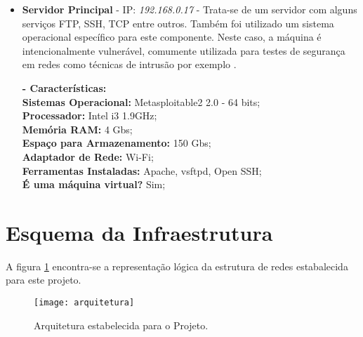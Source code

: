 \begin{itemize}
			\textbf{- Características:} \\
			\textbf{Sistemas Operacional:} Security Onion 12.04 - 64 bits; \\
			\textbf{Processador:} Intel i3 1.9GHz; \\
			\textbf{Memória RAM:} 4 Gbs; \\
			\textbf{Espaço para Armazenamento:} 150 Gbs; \\
			\textbf{Adaptador de Rede:} Wi-Fi; \\
			\textbf{Ferramentas Instaladas:} Snort e Snorby; \\
			\textbf{É uma máquina virtual?} Não; \\
	
			\item \textbf{Servidor Principal} - IP: \emph{192.168.0.17} - Trata-se de um servidor com alguns serviços FTP, SSH, TCP entre outros. Também foi utilizado um sistema operacional específico para este componente. Neste caso, a máquina é intencionalmente vulnerável, comumente utilizada para testes de segurança em redes como técnicas de intrusão por exemplo \cite{metasploitable2}. 

			\textbf{- Características:} \\
			\textbf{Sistemas Operacional:} Metasploitable2 2.0 - 64 bits; \\
			\textbf{Processador:} Intel i3 1.9GHz; \\
			\textbf{Memória RAM:} 4 Gbs; \\
			\textbf{Espaço para Armazenamento:} 150 Gbs; \\
			\textbf{Adaptador de Rede:} Wi-Fi; \\
			\textbf{Ferramentas Instaladas:} Apache, vsftpd, Open SSH; \\
			\textbf{É uma máquina virtual?} Sim; \\
	
		\end{itemize}


	\section{Esquema da Infraestrutura}
	\label{sec:Arquitetura_Esquema_Infra}

		A figura \ref{fig:arquitetura} encontra-se a representação lógica da estrutura de redes estabalecida para este projeto.

		\begin{figure}[h]
			\centering
			\texttt{[image: arquitetura]}
			\caption{Arquitetura estabelecida para o Projeto.}
			\label{fig:arquitetura}
		\end{figure}

